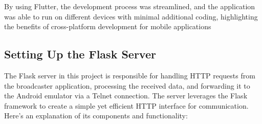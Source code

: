 \documentclass[a4paper,12pt]{article}
\begin{document}
By using Flutter, the development process was streamlined, and the application was able to run on different devices with minimal additional coding, highlighting the benefits of cross-platform development for mobile applications

\subsection{Setting Up the Flask Server}
The Flask server in this project is responsible for handling HTTP requests from the broadcaster application, processing the received data, and forwarding it to the Android emulator via a Telnet connection. The server leverages the Flask framework to create a simple yet efficient HTTP interface for communication. Here's an explanation of its components and functionality:
\end{document}
